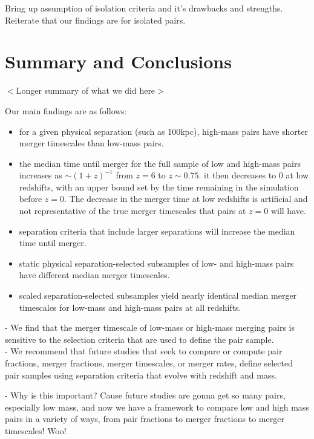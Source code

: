 \documentclass[twocolumn,linenumbers]{aastex631}
\begin{document}
Bring up assumption of isolation criteria and it's drawbacks and strengths.
Reiterate that our findings are for isolated pairs. 



\section{Summary and Conclusions}
$<$Longer summary of what we did here$>$

Our main findings are as follows: 
\begin{itemize}
    \item for a given physical separation (such as 100kpc), high-mass pairs have shorter merger timescales than low-mass pairs. 
    \item the median time until merger for the full sample of low and high-mass pairs increases as $\sim(1+z)^{-1}$ from $z=6$ to $z\sim0.75$. it then decreases to 0 at low redshifts, with an upper bound set by the time remaining in the simulation before $z=0$. The decrease in the merger time at low redshifts is artificial and not representative of the true merger timescales that pairs at $z=0$ will have.
    \item separation criteria that include larger separations will increase the median time until merger.
    \item static physical separation-selected subsamples of low- and high-mass pairs have different median merger timescales.
    \item scaled separation-selected subsamples yield nearly identical median merger timescales for low-mass and high-mass pairs at all redshifts. 
\end{itemize}

- We find that the merger timescale of low-mass or high-mass merging pairs is sensitive to the selection criteria that are used to define the pair sample.\\

- We recommend that future studies that seek to compare or compute pair fractions, merger fractions, merger timescales, or merger rates, define selected pair samples using separation criteria that evolve with redshift and mass. 

- Why is this important? Cause future studies are gonna get so many pairs, especially low mass, and now we have a framework to compare low and high mass pairs in a variety of ways, from pair fractions to merger fractions to merger timescales! Woo!












{}

\end{document}
